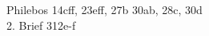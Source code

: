 \documentclass[12pt]{article}
\newcommand*{\zitatblock}[1]{%
    \begin{quote}
    \fontsize{10}{12}\selectfont
    \setlength{\parskip}{1.0em}
    #1
    \end{quote}
}
\begin{document}
Philebos 14cff, 23eff, 27b 30ab, 28c, 30d\\
2. Brief 312e-f
\end{document}
